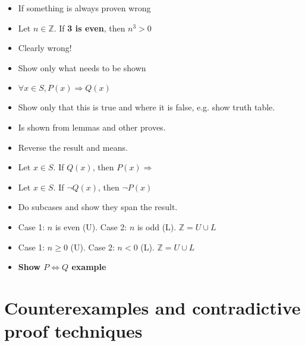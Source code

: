 \documentclass[english,10pt,a4paper]{article}
\begin{document}
\begin{theo} 
\begin{itemize}
\item If something is always proven wrong
\item Let $n \in \mathbb{Z}$. If \textbf{3 is even}, then $n^3 > 0$
\item[] Clearly wrong!
\end{itemize}
\end{theo}



\begin{theo} 
\begin{itemize}
\item Show only what needs to be shown
\item $\forall x \in S, P(x) \Rightarrow Q(x)$
\item[] Show only that this is true and where it is false, e.g. show truth table.
\item Is shown from lemmas and other proves.
\end{itemize}
\end{theo}



\begin{theo} 
\begin{itemize}
\item Reverse the result and means.
\item Let $x \in S$. If $Q(x)$, then $P(x) \Rightarrow$
\item[] Let $x \in S$. If $\neg Q(x)$, then $\neg P(x)$
\end{itemize}
\end{theo}



\begin{theo} 
\begin{itemize}
\item Do subcases and show they span the result.
\item Case 1: $n$ is even (U). Case 2: $n$ is odd (L). $\mathbb{Z} = U \cup L $
\item Case 1: $n\geq0$ (U). Case 2: $n<0$ (L). $\mathbb{Z} = U \cup L$
\item \textbf{Show $P \Leftrightarrow Q$ example}
\end{itemize}
\end{theo}


\newpage
\section{Counterexamples and contradictive proof techniques}
\end{document}
